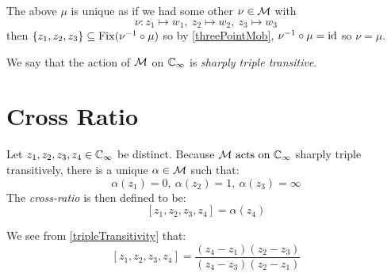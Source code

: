 \documentclass[../main.tex]{subfiles}
\begin{document}
\begin{remark}
  The above $\mu$ is unique as if we had some other $\nu \in \mathcal{M}$ with
  \[
    \nu: z_1 \mapsto w_1,\ z_2 \mapsto w_2,\ z_3 \mapsto w_3
  \]
  then $\{z_1, z_2, z_3\} \subseteq \operatorname{Fix}(\nu^{-1} \circ \mu)$ so by \cref{threePointMob}, $\nu^{-1} \circ \mu = \mathrm{id}$ so $\nu = \mu$.

  We say that the action of $\mathcal{M}$ on $\mathbb{C}_{\infty}$ is \textit{sharply triple transitive}.
\end{remark}
\section{Cross Ratio} \label{crossRatio}
\begin{definition}
  Let $z_1, z_2, z_3, z_4 \in \mathbb{C}_{\infty}$ be distinct.
  Because $\mathcal{M} \text{ acts on } \mathbb{C}_{\infty}$ sharply triple transitively, there is a unique $\alpha \in \mathcal{M}$ such that:
  \[
    \alpha(z_1) = 0,\ \alpha(z_2) = 1,\ \alpha(z_3) = \infty
  \]
  The \textit{cross-ratio} is then defined to be:
  \[
    [z_1, z_2, z_3, z_4] = \alpha(z_4)
  \]
\end{definition}
\begin{remark}[Note]
  We see from \cref{tripleTransitivity} that:
  \[
    [z_1, z_2, z_3, z_4] = \frac{(z_4 - z_1)(z_2 - z_3)}{(z_4 - z_3)(z_2 - z_1)}
  \]
\end{remark}
\end{document}
